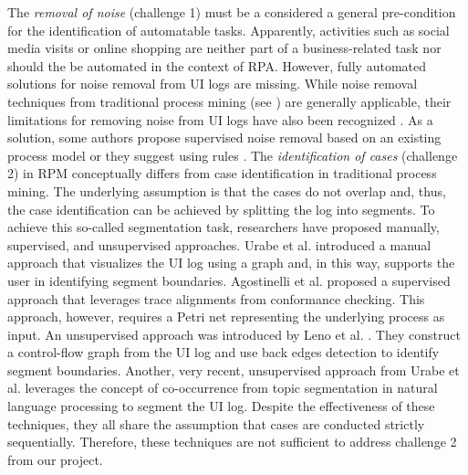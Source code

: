 The \textit{removal of noise} (challenge 1) must be a considered a general pre-condition for the identification of automatable tasks. Apparently, activities such as social media visits or online shopping are neither part of a business-related task nor should the be automated in the context of RPA. However, fully automated solutions for noise removal from UI logs are missing. While noise removal techniques from traditional process mining (see \cite{tax2017discovering,CHENG2015138}) are generally applicable, their limitations for removing noise from UI logs have also been recognized \cite{leno2021robotic}. As a solution, some authors propose supervised noise removal based on an existing process model \cite{agostinelli202111} or they suggest using rules \cite{bosco2019discovering,leno2020identifying}. 
%
The \textit{identification of cases} (challenge 2) in RPM conceptually differs from case identification in traditional process mining. The underlying assumption is that the cases do not overlap and, thus, the case identification can be achieved by splitting the log into segments. To achieve this so-called segmentation task, researchers have proposed manually, supervised, and unsupervised approaches. Urabe et al. \cite{urabe2019visualizing} introduced a manual approach that visualizes the UI log using a graph and, in this way, supports the user in identifying segment boundaries. Agostinelli et al. \cite{agostinelli202111} proposed a supervised approach that leverages trace alignments from conformance checking. This approach, however, requires a Petri net representing the underlying process as input. An unsupervised approach was introduced by Leno et al. \cite{leno2020identifying}. They construct a control-flow graph from the UI log and use back edges detection to identify segment boundaries. Another, very recent, unsupervised approach from Urabe et al. \cite{Urabe21} leverages the concept of co-occurrence from topic segmentation in natural language processing to segment the UI log. Despite the effectiveness of these techniques, they all share the assumption that cases are conducted strictly sequentially. Therefore, these techniques are not sufficient to address challenge 2 from our project.   

\noindent{}

